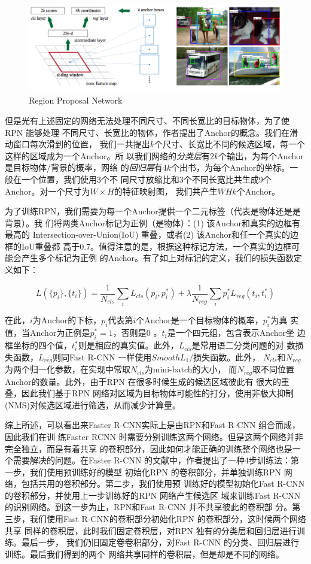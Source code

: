 \begin{figure}[ht]
  \centering
  \includegraphics[width=0.8\linewidth]{./Figure/RPN.png}
  \caption{Region Proposal Network\cite{Ren:2015ug}}\label{Fig:RPN}
\end{figure}

但是光有上述固定的网络无法处理不同尺寸、不同长宽比的目标物体，为了使RPN 能够处理
不同尺寸、长宽比的物体，作者提出了Anchor的概念。我们在滑动窗口每次滑到的位置，
我们一共提出$k$个尺寸、长宽比不同的候选区域，每一个这样的区域成为一个Anchor。所
以我们网络的\textit{分类层}有$2k$个输出，为每个Anchor是目标物体/背景的概率，网络
的\textit{回归层}有$4k$个出书，为每个Anchor的坐标。一般在一个位置，我们使用3个不
同尺寸放缩比和3个不同长宽比共生成9个Anchor。对一个尺寸为$W \times H$的特征映射图，
我们共产生$WHk$个Anchor。

为了训练RPN，我们需要为每一个Anchor提供一个二元标签（代表是物体还是是背景）。我
们将两类Anchor标记为正例（是物体）：(1) 该Anchor和真实的边框有最高的
Intersection-over-Union(IoU) 重叠，或者(2) 该Anchor和任一个真实的边框的IoU重叠都
高于0.7。值得注意的是，根据这种标记方法，一个真实的边框可能会产生多个标记为正例
的Anchor。有了如上对标记的定义，我们的损失函数定义如下：

\[
L(\{p_i\}, \{t_i\}) = \frac{1}{N_{cls}}\sum_i{L_{cls}(p_i, p_i^*)} + \lambda\frac{1}{N_{reg}}\sum_i{p_i^*L_{reg}(t_i,t_i^*)}
\]

在此，$i$为Anchor的下标，$p_i$代表第$i$个Anchor是一个目标物体的概率，$p_i^*$为真
实值，当Anchor为正例是$p_i^* = 1$，否则是0 。$t_i$是一个四元组，包含表示Anchor坐
边框坐标的四个值，$t_i^*$则是相应的真实值。此外，$L_{cls}$是常用语二分类问题的对
数损失函数，$L_{reg}$则同Fast R-CNN 一样使用$Smooth L_1/$损失函数。此外，
$N_{cls}$和$N_{reg}$为两个归一化参数，在实现中常取$N_{cls}$为mini-batch的大小，
而$N_{reg}$取不同位置Anchor的数量。此外，由于RPN 在很多时候生成的候选区域彼此有
很大的重叠，因此我们基于RPN 网络对区域为目标物体可能性的打分，使用非极大抑制
(NMS)对候选区域进行筛选，从而减少计算量。

综上所述，可以看出来Faster R-CNN实际上是由RPN和Fast R-CNN 组合而成，因此我们在训
练Faster RCNN 时需要分别训练这两个网络。但是这两个网络并非完全独立，而是有着共享
的卷积部分，因此如何才能正确的训练整个网络也是一个需要解决的问题。在Faster R-CNN
的文献\cite{Ren:2015ug}中，作者提出了一种4步训练法：第一步，我们使用预训练好的模型
初始化RPN 的卷积部分，并单独训练RPN 网络，包括共用的卷积部分。第二步，我们使用预
训练好的模型初始化Fast R-CNN 的卷积部分，并使用上一步训练好的RPN 网络产生候选区
域来训练Fast R-CNN 的识别网络。到这一步为止，RPN和Fast R-CNN 并不共享彼此的卷积部
分。第三步，我们使用Fast R-CNN的卷积部分初始化RPN 的卷积部分，这时候两个网络共享
同样的卷积层，此时我们固定卷积层，对RPN 独有的分类层和回归层进行训练。最后一步，
我们仍旧固定卷卷积部分，对Fast R-CNN 的分类、回归层进行训练。最后我们得到的两个
网络共享同样的卷积层，但是却是不同的网络。


